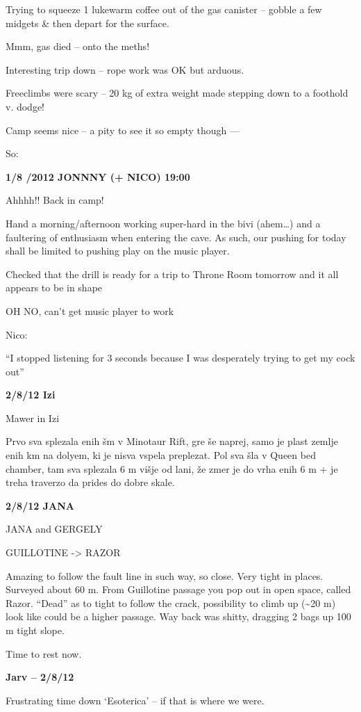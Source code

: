 Trying to squeeze 1 lukewarm coffee out of the gas canister -- gobble a
few midgets \& then depart for the surface.

Mmm, gas died -- onto the meths!

Interesting trip down -- rope work was OK but arduous.

Freeclimbs were scary -- 20 kg of extra weight made stepping down to a
foothold v. dodge!

Camp seems nice -- a pity to see it so empty though ---

So:

\textbf{1/8 /2012 JONNNY (+ NICO) 19:00}

Ahhhh!! Back in camp!

Hand a morning/afternoon working super-hard in the bivi (ahem\ldots{})
and a faultering of enthusiasm when entering the cave. As such, our
pushing for today shall be limited to pushing play on the music player.

Checked that the drill is ready for a trip to Throne Room tomorrow and
it all appears to be in shape

OH NO, can't get music player to work

Nico:

``I stopped listening for 3 seconds because I was desperately trying to
get my cock out''

\textbf{2/8/12 Izi}

Mawer in Izi

Prvo sva splezala enih šm v Minotaur Rift, gre še naprej, samo je plast
zemlje enih km na dolyem, ki je nisva vspela preplezat. Pol sva šla v
Queen bed chamber, tam sva splezala 6 m višje od lani, že zmer je do
vrha enih 6 m + je treha traverzo da prides do dobre skale.

\textbf{2/8/12 JANA}

JANA and GERGELY

GUILLOTINE -\textgreater{} RAZOR

Amazing to follow the fault line in such way, so close. Very tight in
places. Surveyed about 60 m. From Guillotine passage you pop out in open
space, called Razor. ``Dead'' as to tight to follow the crack,
possibility to climb up (\textasciitilde 20 m) look like could be a
higher passage. Way back was shitty, dragging 2 bags up 100 m tight
slope.

Time to rest now.

\textbf{Jarv -- 2/8/12}

Frustrating time down `Esoterica' -- if that is where we were.

